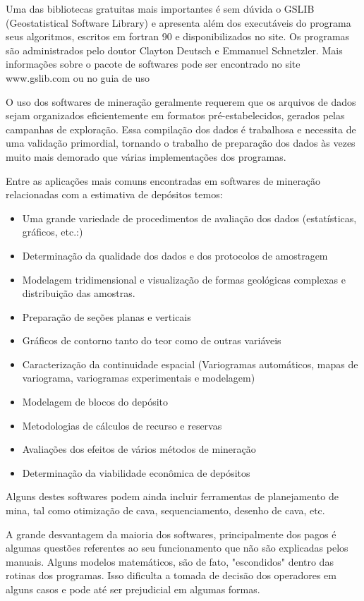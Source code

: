 Uma das bibliotecas gratuitas mais importantes é sem dúvida o GSLIB (Geostatistical Software Library) e apresenta além dos executáveis do programa seus algoritmos, escritos em fortran 90 e disponibilizados no site. Os programas são administrados pelo doutor Clayton Deutsch e Emmanuel Schnetzler. Mais informações sobre o pacote de softwares pode ser encontrado no site www.gslib.com ou no guia de uso \cite{deutschcv1998gslib}

O uso dos softwares de mineração geralmente requerem que os arquivos de dados sejam organizados eficientemente em formatos pré-estabelecidos, gerados pelas campanhas de exploração.  Essa compilação dos dados é trabalhosa e necessita de uma validação primordial, tornando o trabalho de preparação dos dados às vezes muito mais demorado que várias implementações dos programas.  

Entre as aplicações mais comuns encontradas em softwares de mineração relacionadas com a estimativa de depósitos temos:

\begin{itemize}
\item Uma grande variedade de procedimentos de avaliação dos dados (estatísticas, gráficos, etc.:)
\item Determinação da qualidade dos dados e dos protocolos de amostragem
\item Modelagem tridimensional e visualização de formas geológicas complexas e distribuição das amostras.
\item Preparação de seções planas e verticais 
\item Gráficos de contorno tanto do teor como de outras variáveis 
\item Caracterização da continuidade espacial (Variogramas automáticos, mapas de variograma, variogramas experimentais e modelagem)
\item Modelagem de blocos do depósito
\item Metodologias de cálculos de recurso e reservas
\item Avaliações dos efeitos de vários métodos de mineração
\item Determinação da viabilidade econômica de depósitos
\end{itemize}

Alguns destes softwares podem ainda incluir ferramentas de planejamento de mina, tal como otimização de cava, sequenciamento, desenho de cava, etc. 

A grande desvantagem da maioria dos softwares, principalmente dos pagos é algumas questões referentes ao seu funcionamento que não são explicadas pelos manuais. Alguns modelos matemáticos, são de fato, "escondidos" dentro das rotinas dos programas. Isso dificulta a tomada de decisão dos operadores em alguns casos e pode até ser prejudicial em algumas formas. 

